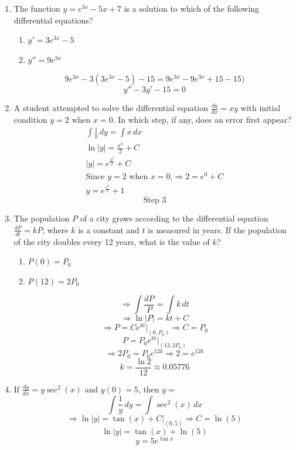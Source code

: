 \documentclass[12pt]{article}
\begin{document}
\begin{enumerate}
    \item The function $y = e^{3x}-5x+7$ is a solution to which of the following differential equations?
\begin{enumerate}
    \item $y'=3e^{3x}-5$
    \item $y''=9e^{3x}$
\end{enumerate}
$$9e^{3x}-3(3e^{3x}-5)-15=9e^{3x}-9e^{3x}+15-15)$$
$$\boxed{y''-3y'-15=0}$$
    \item A student attempted to solve the differential equation $\frac{dy}{dx}=xy$ with initial condition $y=2$ when $x=0$. In which step, if any, does an error first appear?
    \begin{align}
\int \frac{1}{y} \, dy= \int x \, dx \\
\ln|y|=\frac{x^2}{2}+C \\
|y| = e^{\frac{x^2}{2}}+C \\
\text{Since $y=2$ when $x=0$,} \Longrightarrow 2=e^0+C \\
y= e^{\frac{x^2}{2}} +1
    \end{align}
    $$\boxed{\text{Step 3}}$$
\item The population $P$ of a city grows according to the differential equation $\frac{dP}{dt}=kP$, where $k$ is a constant and $t$ is measured in years. If the population of the city doubles every 12 years, what is the value of $k$?
\begin{enumerate}
    \item $P(0)=P_0$
    \item $P(12)=2P_0$
\end{enumerate}

$$\Longrightarrow \int \frac{dP}{P} = \int k \, dt$$
$$\Longrightarrow \ln|P|=kt +C$$
$$\Longrightarrow P=Ce^{kt}\biggr\rvert_{(0, P_0)} \Longrightarrow C=P_0$$
$$ P=P_0e^{kt} \biggr\rvert_{(12,2P_0)}$$
$$\Longrightarrow 2P_0=P_0e^{12k} \Longrightarrow 2=e^{12k} $$
$$\boxed{k=\frac{\ln 2}{12} \approx 0.05776}$$

\item If $\frac{dy}{dx} = y\sec^2(x)$ and $y(0)=5$, then $y=$
$$\int \frac{1}{y} \, dy =\int \sec^2(x) \, dx$$
$$\Longrightarrow \ln|y|=\tan(x)+C \biggr\rvert_{(0,5)} \Longrightarrow C=\ln(5) $$
$$\ln|y|=\tan(x)+\ln(5)$$
$$y=5e^{\tan x}$$


\end{enumerate}
\end{document}
